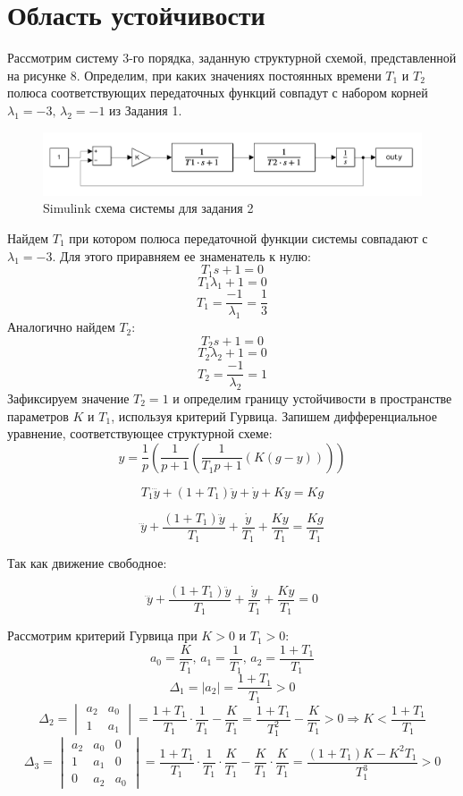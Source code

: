 \chapter{Область устойчивости}
Рассмотрим систему 3-го порядка, заданную структурной схемой, 
представленной на рисунке 8. Определим, при каких значениях постоянных 
времени \( T_1 \) и \( T_2 \) полюса соответствующих передаточных функций совпадут с
набором корней \( \lambda_{1} = -3,\,\lambda_{2} = -1 \) из Задания 1.
\begin{figure}[H]
    \centering
    \includegraphics[width=1\textwidth]{../images/sim2.png}
    \caption{Simulink схема системы для задания 2}
\end{figure}

Найдем \( T_1 \) при котором полюса передаточной функции системы совпадают с 
\( \lambda_{1} = -3\). Для этого приравняем ее знаменатель к нулю:
\[
    T_1s + 1 = 0
\]
\[
    T_1\lambda_1 + 1 = 0
\]
\[
    T_1 = \frac{-1}{\lambda_1} = \frac{1}{3}
\]
Аналогично найдем \( T_2 \):
\[
    T_2s + 1 = 0
\]
\[
    T_2\lambda_2 + 1 = 0
\]
\[
    T_2 = \frac{-1}{\lambda_2} = 1
\]
Зафиксируем значение \( T_2 = 1 \) и определим границу устойчивости в 
пространстве параметров \( K \) и \( T_1 \), используя критерий Гурвица. 
Запишем дифференциальное уравнение, соответствующее структурной схеме:
\[
y = \frac{1}{p} \left( \frac{1}{p + 1} \left( \frac{1}{T_1 p + 1} \left( K(g - y) \right) \right) \right)
\]

\[
T_1 \dddot{y} + (1 + T_1) \ddot{y} + \dot y + Ky = Kg
\]

\[
\dddot{y} + \frac{(1 + T_1) \ddot{y}}{T_1}+ \frac{\dot y}{T_1} + \frac{Ky}{T_1} = \frac{Kg}{T_1}
\]

Так как движение свободное:

\[
\dddot{y} + \frac{(1 + T_1) \ddot{y}}{T_1}+ \frac{\dot y}{T_1} + \frac{Ky}{T_1} = 0
\]

Рассмотрим критерий Гурвица при \( K>0 \) и \( T_1>0 \):
\[
a_0 = \frac{K}{T_1}, \, a_1 = \frac{1}{T_1}, \, a_2 = \frac{1 + T_1}{T_1}
\]
\[
\Delta_1 = |a_2| = \frac{1 + T_1}{T_1} > 0
\]
\[
\Delta_2 = \begin{vmatrix}
    a_2 & a_0 \\
    1 & a_1
\end{vmatrix}
= \frac{1 + T_1}{T_1} \cdot \frac{1}{T_1} - \frac{K}{T_1} = \frac{1+T_1}{T_1^2} - \frac{K}{T_1} > 0
\Rightarrow K < \frac{1+T_1}{T_1}
\]
\[
\Delta_3 = \begin{vmatrix}
    a_2 & a_0 & 0 \\
    1 & a_1 & 0 \\
    0 & a_2 & a_0
\end{vmatrix} =
\frac{1 + T_1}{T_1} \cdot \frac{1}{T_1} \cdot \frac{K}{T_1} - \frac{K}{T_1} \cdot \frac{K}{T_1}
= \frac{(1+T_1)K - K^2T_1}{T_1^3} > 0
\]

